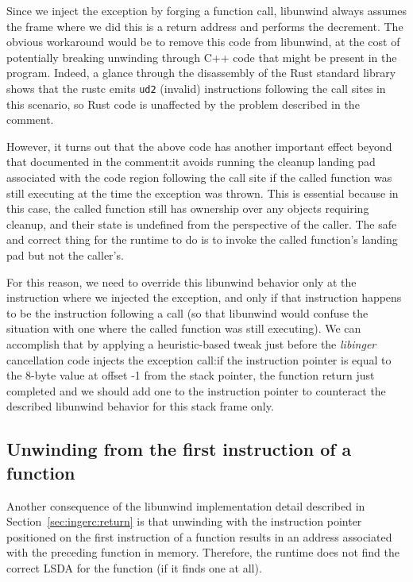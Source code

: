 Since we inject the exception by forging a function call, libunwind always assumes
the frame where we did this is a return address and performs the decrement.  The
obvious workaround would be to remove this code from libunwind, at the cost of
potentially breaking unwinding through C++ code that might be present in the program.
Indeed, a glance through the disassembly of the Rust standard library shows that the
rustc emits \texttt{ud2} (invalid) instructions following the call sites in this
scenario, so Rust code is unaffected by the problem described in the comment.

However, it turns out that the above code has another important effect beyond that
documented in the comment:\@ it avoids running the cleanup landing pad associated
with the code region following the call site if the called function was still
executing at the time the exception was thrown.  This is essential because in this
case, the called function still has ownership over any objects requiring cleanup, and
their state is undefined from the perspective of the caller.  The safe and correct
thing for the runtime to do is to invoke the called function's landing pad but not
the caller's.

For this reason, we need to override this libunwind behavior only at the instruction
where we injected the exception, and only if that instruction happens to be the
instruction following a call (so that libunwind would confuse the situation with one
where the called function was still executing).  We can accomplish that by applying
a heuristic-based tweak just before the \textit{libinger} cancellation code injects
the exception call:\@ if the instruction pointer is equal to the 8-byte value at
offset -1 from the stack pointer, the function return just completed and we should
add one to the instruction pointer to counteract the described libunwind behavior for
this stack frame only.


\subsection{Unwinding from the first instruction of a function}

Another consequence of the libunwind implementation detail described in
Section~\ref{sec:ingerc:return} is that unwinding with the instruction pointer
positioned on the first instruction of a function results in an address associated
with the preceding function in memory.  Therefore, the runtime does not find the
correct LSDA for the function (if it finds one at all).

